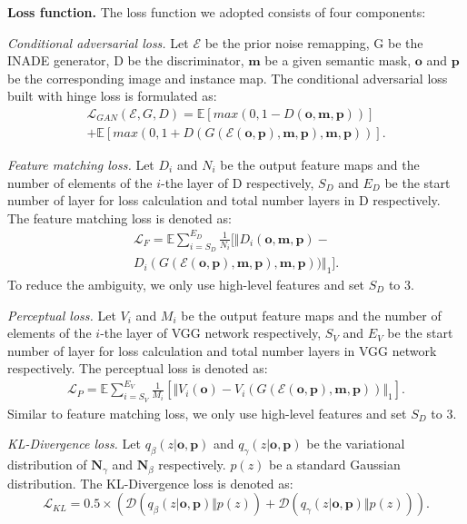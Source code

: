 \documentclass[final]{cvpr}
\begin{document}
\noindent\textbf{Loss function.} The loss function we adopted consists of four components:

\textit{Conditional adversarial loss.} Let $\mathcal{E}$ be the prior noise remapping, G be the INADE generator, D be the discriminator, $\bm{m}$ be a given semantic mask, $\bm{o}$ and $\bm{p}$ be the corresponding image and instance map. The conditional adversarial loss built with hinge loss is formulated as:
\begin{equation}
\begin{split}
\mathcal{L}_{GAN}(\mathcal{E}, G, D) = \mathbb{E}[max(0,1-D(\bm{o},\bm{m},\bm{p}))] \\+ \mathbb{E}[max(0,1+D(G(\mathcal{E}(\bm{o},\bm{p}),\bm{m},\bm{p}),\bm{m},\bm{p}))].
\end{split}
\end{equation}

\textit{Feature matching loss.} Let $D_i$ and $N_i$ be the output feature maps and the number of elements of the $i$-the layer of D respectively, $S_D$ and $E_D$ be the start number of layer for loss calculation and total number layers in D respectively. The feature matching loss is denoted as:
\begin{equation}
\begin{split}
    \mathcal{L}_{F}=\mathbb{E}\sum_{i=S_D}^{E_D} \frac{1}{N_i}[\Vert D_i(\bm{o},\bm{m},\bm{p})-\\
    D_i(G(\mathcal{E}(\bm{o},\bm{p}),\bm{m},\bm{p}),\bm{m},\bm{p}))\Vert_1].
\end{split}
\end{equation}
To reduce the ambiguity, we only use high-level features and set $S_D$ to $3$.

\textit{Perceptual loss.} Let $V_i$ and $M_i$ be the output feature maps and the number of elements of the $i$-the layer of VGG network respectively, $S_V$ and $E_V$ be the start number of layer for loss calculation and total number layers in VGG network respectively. The perceptual loss is denoted as:
\begin{equation}
\begin{split}
    \mathcal{L}_{P}=\mathbb{E}\sum_{i=S_V}^{E_V} \frac{1}{M_i}[\Vert V_i(\bm{o})-
    V_i(G(\mathcal{E}(\bm{o},\bm{p}),\bm{m},\bm{p}))\Vert_1].
\end{split}
\end{equation}
Similar to feature matching loss, we only use high-level features and set $S_D$ to $3$.

\textit{KL-Divergence loss.} Let $q_\beta(z|\bm{o},\bm{p})$ and $q_\gamma(z|\bm{o},\bm{p})$ be the variational distribution of $\bm{N}_\gamma$ and $\bm{N}_\beta$ respectively. $p(z)$ be a standard Gaussian distribution. The KL-Divergence loss is denoted as:
\begin{equation}
    \mathcal{L}_{KL}=0.5\times(\mathcal{D}(q_\beta(z|\bm{o},\bm{p}) \Vert p(z)) + \mathcal{D}(q_\gamma(z|\bm{o},\bm{p}) \Vert p(z))).
\end{equation}
\end{document}
